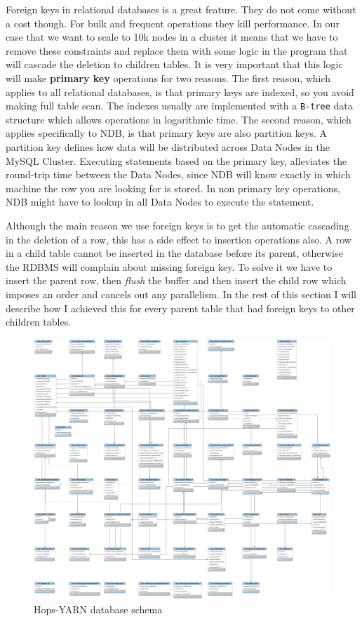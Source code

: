Foreign keys in relational databases is a great feature. They do not
come without a cost though. For bulk and frequent operations they kill
performance. In our case that we want to scale to 10k nodes in a
cluster it means that we have to remove these constraints and replace
them with some logic in the program that will cascade the deletion to
children tables. It is very important that this logic will make
\textbf{primary key} operations for two reasons. The first reason, which
applies to all relational databases, is that primary keys are indexed,
so you avoid making full table scan. The indexes usually are
implemented with a \texttt{B-tree} data structure which allows
operations in logarithmic time. The second reason, which applies
specifically to NDB, is that primary keys are also partition keys. A
partition key defines how data will be distributed across Data Nodes
in the MySQL Cluster. Executing statements based on the primary key,
alleviates the round-trip time between the Data Nodes, since NDB will
know exactly in which machine the row you are looking for is
stored. In non primary key operations, NDB might have to lookup in all
Data Nodes to execute the statement.

Although the main reason we use foreign keys is to get the
automatic cascading in the deletion of a row, this has a side effect to
insertion operations also. A row in a child table cannot be inserted
in the database before its parent, otherwise the RDBMS will complain
about missing foreign key. To solve it we have to insert the parent
row, then \emph{flush} the buffer and then insert the child row which
imposes an order and cancels out any parallelism. In the rest of this section I will describe how I achieved
this for every parent table that had foreign keys to other children tables.

\begin{figure}
\centering
\includegraphics[scale=0.2,angle=90]{resources/images/Implementation/hops_yarn_ndb_schema_full.png}
\caption{Hops-YARN database schema}
\label{fig:impl_fk_yarn_schema}
\end{figure}

